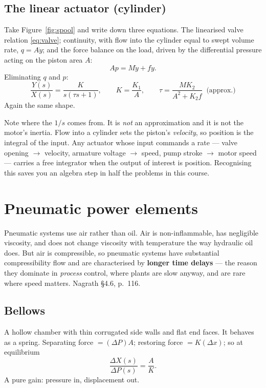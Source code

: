\documentclass[11pt,a4paper]{article}
\begin{document}
\subsection{The linear actuator (cylinder)}

Take Figure~\ref{fig:spool} and write down three equations. The linearised
valve relation \eqref{eq:valve}; continuity, with flow into the cylinder equal
to swept volume rate, $q=A\dot y$; and the force balance on the load, driven by
the differential pressure acting on the piston area $A$:
\[
  Ap = M\ddot y + f\dot y .
\]
Eliminating $q$ and $p$:
\begin{equation}
  \frac{Y(s)}{X(s)}=\frac{K}{s(\tau s+1)},
  \qquad K=\frac{K_1}{A},\qquad \tau=\frac{MK_2}{A^2+K_2 f}\;\;\text{(approx.)}
  \label{eq:cyl}
\end{equation}
Again the same shape.

\begin{pitfall}
Note where the $1/s$ comes from. It is \emph{not} an approximation and it is
not the motor's inertia. Flow into a cylinder sets the piston's \emph{velocity},
so position is the integral of the input. Any actuator whose input commands a
rate --- valve opening $\to$ velocity, armature voltage $\to$ speed, pump stroke
$\to$ motor speed --- carries a free integrator when the output of interest is
position. Recognising this saves you an algebra step in half the problems in
this course.
\end{pitfall}

\section{Pneumatic power elements}
\label{sec:pneu}

Pneumatic systems use air rather than oil. Air is non-inflammable, has
negligible viscosity, and does not change viscosity with temperature the way
hydraulic oil does. But air is compressible, so pneumatic systems have
substantial compressibility flow and are characterised by \textbf{longer time
delays} --- the reason they dominate in \emph{process} control, where plants are
slow anyway, and are rare where speed matters. Nagrath \S4.6, p.~116.

\subsection{Bellows}

A hollow chamber with thin corrugated side walls and flat end faces. It behaves
as a spring. Separating force $=(\Delta P)A$; restoring force $=K(\Delta x)$;
so at equilibrium
\begin{equation}
  \frac{\Delta X(s)}{\Delta P(s)}=\frac{A}{K}.
  \label{eq:bellows}
\end{equation}
A pure gain: pressure in, displacement out.
\end{document}

